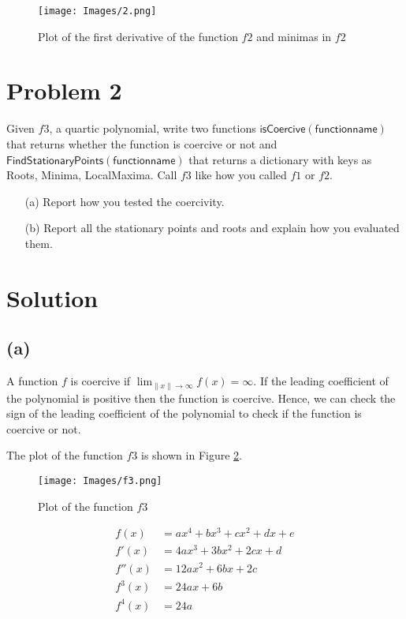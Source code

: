 \documentclass{article}
\begin{document}
\begin{figure}
    \centering
    \texttt{[image: Images/2.png]}
    \caption{Plot of the first derivative of the function $f2$ and minimas in $f2$}
    \label{fig:f2_first_derivative}
\end{figure}

\clearpage

\section*{Problem 2}

Given $f3$, a quartic polynomial, write two functions $\mathsf{isCoercive(function name)}$ that returns whether the function is coercive or not and $\mathsf{FindStationaryPoints(function name)}$ that returns a dictionary with keys as Roots, Minima, LocalMaxima. Call $f3$ like how you called $f1$ or $f2$.

\begin{enumerate}
    \item [(a)] Report how you tested the coercivity.
    \item [(b)] Report all the stationary points and roots and explain how you evaluated them.
\end{enumerate}

\section*{Solution}

\subsection*{(a)}

A function $f$ is coercive if $\lim_{\|x\| \to \infty} f(x) = \infty$. If the leading coefficient of the polynomial is positive then the function is coercive. Hence, we can check the sign of the leading coefficient of the polynomial to check if the function is coercive or not.

The plot of the function $f3$ is shown in Figure \ref{fig:f3}.

\begin{figure}
    \centering
    \texttt{[image: Images/f3.png]}
    \caption{Plot of the function $f3$}
    \label{fig:f3}
\end{figure}

\begin{align*}
    f(x) &= ax^4 + bx^3 + cx^2 + dx + e \\
    f'(x) &= 4ax^3 + 3bx^2 + 2cx + d \\
    f''(x) &= 12ax^2 + 6bx + 2c \\
    f^3(x) &= 24ax + 6b \\
    f^4(x) &= 24a
\end{align*}
\end{document}
